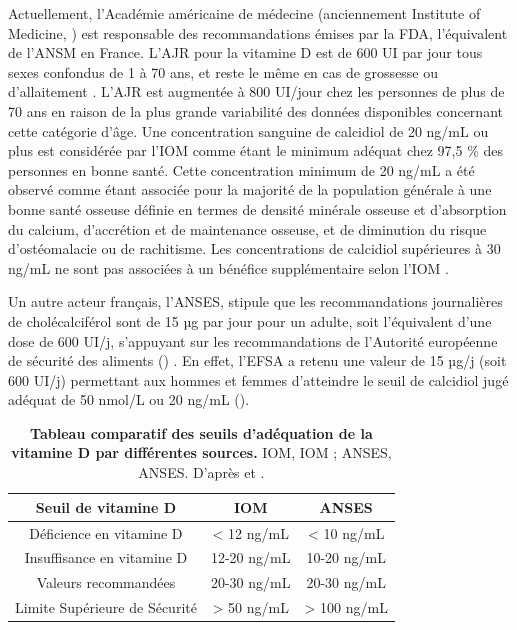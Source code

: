 \documentclass[
  a4paper,
  DIV=11,
  numbers=noendperiod,
  listof=totoc]{scrreprt}
\begin{document}
Actuellement, l'Académie américaine de médecine (anciennement Institute
of Medicine, ) est responsable des recommandations émises par
la \ac{FDA}, l'équivalent de l'\ac{ANSM} en France. L'\ac{AJR} pour la
vitamine D est de 600 UI par jour tous sexes confondus de 1 à 70 ans, et
reste le même en cas de grossesse ou d'allaitement \autocite{IOM.2011}.
L'\ac{AJR} est augmentée à 800 UI/jour chez les personnes de plus de 70
ans en raison de la plus grande variabilité des données disponibles
concernant cette catégorie d'âge. Une concentration sanguine de
calcidiol de 20 ng/mL ou plus est considérée par l'\ac{IOM} comme étant
le minimum adéquat chez 97,5 \% des personnes en bonne santé. Cette
concentration minimum de 20 ng/mL a été observé comme étant associée
pour la majorité de la population générale à une bonne santé osseuse
définie en termes de densité minérale osseuse et d'absorption du
calcium, d'accrétion et de maintenance osseuse, et de diminution du
risque d'ostéomalacie ou de rachitisme. Les concentrations de calcidiol
supérieures à 30 ng/mL ne sont pas associées à un bénéfice
supplémentaire selon l'\ac{IOM} \autocite{IOM.2011,Rosen.IOM.2012}.

Un autre acteur français, l'\ac{ANSES}, stipule que les recommandations
journalières de cholécalciférol sont de 15 µg par jour pour un adulte,
soit l'équivalent d'une dose de 600 UI/j, s'appuyant sur les
recommandations de l'Autorité européenne de sécurité des aliments
() \autocite{ANSES.2021}. En effet, l'\ac{EFSA} a retenu une
valeur de 15 µg/j (soit 600 UI/j) permettant aux hommes et femmes
d'atteindre le seuil de calcidiol jugé adéquat de 50 nmol/L ou 20 ng/mL
\autocite{ANSES.2022.note} ().

\begin{table}
\caption[Tableau comparatif des seuils d'adéquation de la vitamine D par différentes sources.]{\textbf{Tableau comparatif des seuils d'adéquation de la vitamine D par différentes sources.} \acs{IOM}, \acl{IOM} ; \acs{ANSES}, \acl{ANSES}. D'après \textcite{IOM.2011} et \textcite{ANSES.2021}.}
\label{tbl-seuil}
\centering
\begin{tabular}{ccc}
\toprule
\textbf{Seuil de vitamine D} & \textbf{IOM} & \textbf{ANSES}\\
\midrule
Déficience en vitamine D & < 12 ng/mL & < 10 ng/mL\\
Insuffisance en vitamine D & 12-20 ng/mL & 10-20 ng/mL\\
Valeurs recommandées & 20-30 ng/mL & 20-30 ng/mL\\
Limite Supérieure de Sécurité & > 50 ng/mL  & > 100 ng/mL \\
\bottomrule
\end{tabular}
\end{table}
\end{document}
